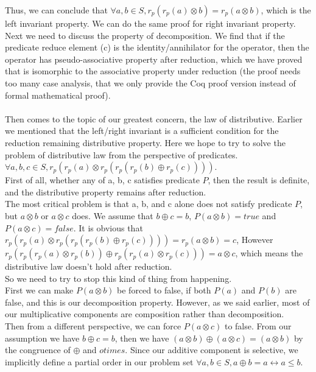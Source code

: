 \documentclass[a4paper,10pt]{article}
\begin{document}
Thus, we can conclude that $\forall a,b \in S, r_p(r_p(a) \otimes b) = r_p(a \otimes b)$, which is the left invariant property. We can do the same proof for right invariant property.\\
Next we need to discuss the property of decomposition. We find that if the predicate reduce element (c) is the identity/annihilator for the operator, then the operator has pseudo-associative property after reduction, which we have proved that is isomorphic to the associative property under reduction (the proof needs too many case analysis, that we only provide the Coq proof version instead of formal mathematical proof).\\\\
Then comes to the topic of our greatest concern, the law of distributive. Earlier we mentioned that the left/right invariant is a sufficient condition for the reduction remaining distributive property. Here we hope to try to solve the problem of distributive law from the perspective of predicates.\\
$\forall a,b,c \in S, r_p(r_p(a) \otimes r_p(r_p(r_p(b) \oplus r_p(c))))$. \\
First of all, whether any of a, b, c satisfies predicate $P$, then the result is definite, and the distributive property remains after reduction.\\
The most critical problem is that a, b, and c alone does not satisfy predicate $P$, but $a \otimes b$ or $a \otimes c$ does. We assume that $b \oplus c = b$, $P(a \otimes b) = true$ and $P(a \otimes c) = false$. It is obvious that $r_p(r_p(a) \otimes r_p(r_p(r_p(b) \oplus r_p(c)))) = r_p(a \otimes b) = c$, However $r_p(r_p(r_p(a) \otimes r_p(b)) \oplus r_p(r_p(a) \otimes r_p(c))) = a \otimes c$, which means the distributive law doesn't hold after reduction.\\
So we need to try to stop this kind of thing from happening.\\
First we can make $P(a \otimes b)$ be forced to false, if both $P(a)$ and $P(b)$ are false, and this is our decomposition property. However, as we said earlier, most of our multiplicative components are composition rather than decomposition.\\
Then from a different perspective, we can force $P(a\otimes c)$ to false. From our assumption we have $b \oplus c = b$, then we have $(a \otimes b) \oplus (a \otimes c) = (a \otimes b)$ by the congruence of $\oplus$ and $otimes$. 
Since our additive component is selective, we implicitly define a partial order in our problem set $\forall a,b \in S, a \oplus b = a \longleftrightarrow a \leq b$. 
\end{document}

